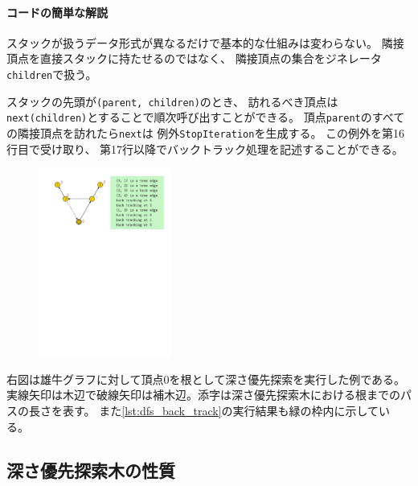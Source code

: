 \begin{paracol}{2}

%
\paragraph{コードの簡単な解説}
スタックが扱うデータ形式が異なるだけで基本的な仕組みは変わらない。
隣接頂点を直接スタックに持たせるのではなく、
隣接頂点の集合をジネレータ{\tt children}で扱う。

スタックの先頭が{\tt (parent, children)}のとき、
訪れるべき頂点は
{\tt next(children)}とすることで順次呼び出すことができる。
頂点{\tt parent}のすべての隣接頂点を訪れたら{\tt next}は
例外{\tt StopIteration}を生成する。
この例外を第16行目で受け取り、
第17行以降でバックトラック処理を記述することができる。


\switchcolumn
\begin{figure}[ht]
\centering
\includegraphics[width=0.39\textwidth]{figures/dfs_bull.pdf}
\end{figure}
\end{paracol}

\vspace*{-0.5\intextsep}
右図は雄牛グラフに対して頂点$0$を根として深さ優先探索を実行した例である。
実線矢印は木辺で破線矢印は補木辺。添字は深さ優先探索木における根までのパスの長さを表す。
また\lstrefname\ref{lst:dfs_back_track}の実行結果も緑の枠内に示している。







\subsection{深さ優先探索木の性質}


